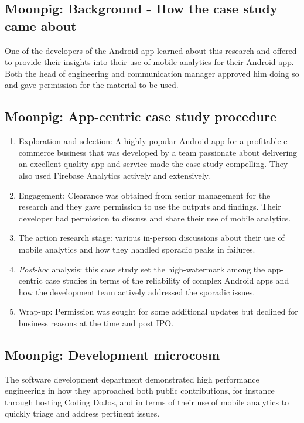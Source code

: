\subsection{Moonpig: Background - How the case study came about}
One of the developers of the Android app learned about this research and offered to provide their insights into their use of mobile analytics for their Android app. Both the head of engineering and communication manager approved him doing so and gave permission for the material to be used.


\subsection{Moonpig: App-centric case study procedure}
{\small
\begin{enumerate}
    \itemsep0em
    \item Exploration and selection: A highly popular Android app for a profitable e-commerce business that was developed by a team passionate about delivering an excellent quality app and service made the case study compelling. They also used Firebase Analytics actively and extensively. 
    \item Engagement: Clearance was obtained from senior management for the research and they gave permission to use the outputs and findings. Their developer had permission to discuss and share their use of mobile analytics. 
    \item The action research stage: various in-person discussions about their use of mobile analytics and how they handled sporadic peaks in failures.
    \item \textit{Post-hoc} analysis: this case study set the high-watermark among the app-centric case studies in terms of the reliability of complex Android apps and how the development team actively addressed the sporadic issues. 
    \item Wrap-up: Permission was sought for some additional updates but declined for business reasons at the time and post IPO.
\end{enumerate}
}


\subsection{Moonpig: Development microcosm}
The software development department demonstrated high performance engineering in how they approached both public contributions, for instance through hosting Coding DoJos, and in terms of their use of mobile analytics to quickly triage and address pertinent issues.

